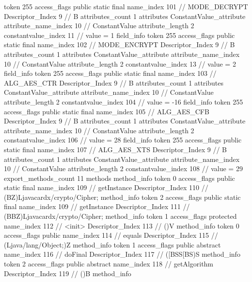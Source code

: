 {{{{{				token	255
				access_flags	public static final
				name_index	101		// MODE_DECRYPT
				Descriptor_Index	9		// B
				attributes_count	1
				attributes {
				ConstantValue_attribute {
					attribute_name_index	10		// ConstantValue
					attribute_length	2
					constantvalue_index	11		// value = 1
				}
				}
			}
			field_info {
				token	255
				access_flags	public static final
				name_index	102		// MODE_ENCRYPT
				Descriptor_Index	9		// B
				attributes_count	1
				attributes {
				ConstantValue_attribute {
					attribute_name_index	10		// ConstantValue
					attribute_length	2
					constantvalue_index	13		// value = 2
				}
				}
			}
			field_info {
				token	255
				access_flags	public static final
				name_index	103		// ALG_AES_CTR
				Descriptor_Index	9		// B
				attributes_count	1
				attributes {
				ConstantValue_attribute {
					attribute_name_index	10		// ConstantValue
					attribute_length	2
					constantvalue_index	104		// value = -16
				}
				}
			}
			field_info {
				token	255
				access_flags	public static final
				name_index	105		// ALG_AES_CFB
				Descriptor_Index	9		// B
				attributes_count	1
				attributes {
				ConstantValue_attribute {
					attribute_name_index	10		// ConstantValue
					attribute_length	2
					constantvalue_index	106		// value = 28
				}
				}
			}
			field_info {
				token	255
				access_flags	public static final
				name_index	107		// ALG_AES_XTS
				Descriptor_Index	9		// B
				attributes_count	1
				attributes {
				ConstantValue_attribute {
					attribute_name_index	10		// ConstantValue
					attribute_length	2
					constantvalue_index	108		// value = 29
				}
				}
			}
			}
			export_methods_count	11
			methods {
				method_info {
					token	0
					access_flags	public static final
					name_index	109		// getInstance
					Descriptor_Index	110		// (BZ)Ljavacardx/crypto/Cipher;
				}
				method_info {
					token	2
					access_flags	public static final
					name_index	109		// getInstance
					Descriptor_Index	111		// (BBZ)Ljavacardx/crypto/Cipher;
				}
				method_info {
					token	1
					access_flags	protected
					name_index	112		// <init>
					Descriptor_Index	113		// ()V
				}
				method_info {
					token	0
					access_flags	public
					name_index	114		// equals
					Descriptor_Index	115		// (Ljava/lang/Object;)Z
				}
				method_info {
					token	1
					access_flags	public abstract
					name_index	116		// doFinal
					Descriptor_Index	117		// ([BSS[BS)S
				}
				method_info {
					token	2
					access_flags	public abstract
					name_index	118		// getAlgorithm
					Descriptor_Index	119		// ()B
				}
				method_info {
}}}}}
